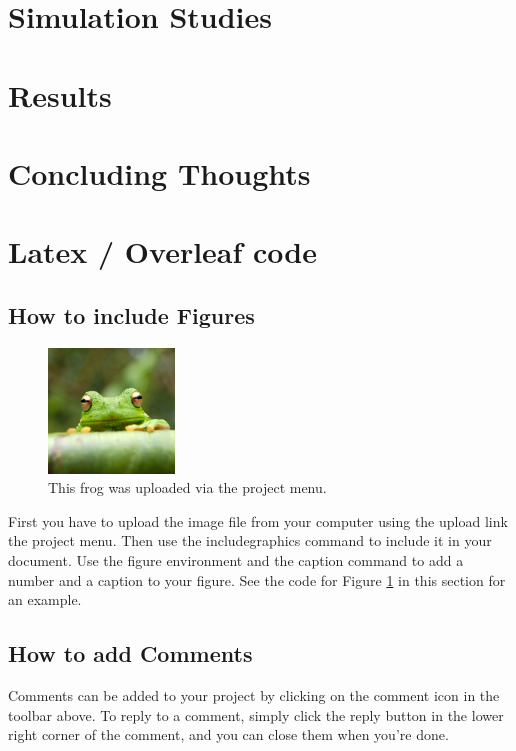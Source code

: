\documentclass[a4paper]{article}\usepackage[]{graphicx}\usepackage[]{color}
\begin{document}
\section{Simulation Studies}

\section{Results}

\section{Concluding Thoughts}

\newpage 
\section{Latex / Overleaf code}
\subsection{How to include Figures}

\begin{figure}[h!]
\centering
\includegraphics[width=0.3\textwidth]{frog.jpg}
\caption{\label{fig:frog}This frog was uploaded via the project menu.}
\end{figure}



First you have to upload the image file from your computer using the upload link the project menu. Then use the includegraphics command to include it in your document. Use the figure environment and the caption command to add a number and a caption to your figure. See the code for Figure \ref{fig:frog} in this section for an example.

\subsection{How to add Comments}

Comments can be added to your project by clicking on the comment icon in the toolbar above. %
%
%
To reply to a comment, simply click the reply button in the lower right corner of the comment, and you can close them when you're done.
\end{document}
